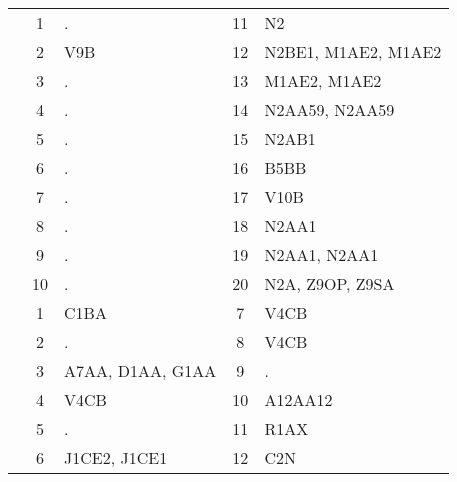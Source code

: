 \begin{table}[htbp]
\begin{tabular}{c c l c l}
	\addlinespace
	7 & 1 & . & 11 & N2 \\
	 & 2 & V9B & 12 & N2BE1, M1AE2, M1AE2 \\
	 & 3 & . & 13 & M1AE2, M1AE2 \\
	 & 4 & . & 14 & N2AA59, N2AA59 \\
	 & 5 & . & 15 & N2AB1 \\
	 & 6 & . & 16 & B5BB \\
	 & 7 & . & 17 & V10B \\
	 & 8 & . & 18 & N2AA1 \\
	 & 9 & . & 19 & N2AA1, N2AA1 \\
	 & 10 & . & 20 & N2A, Z9OP, Z9SA \\
	\addlinespace
	8 & 1 & C1BA & 7 & V4CB \\
	 & 2 & . & 8 & V4CB \\
	 & 3 & A7AA, D1AA, G1AA & 9 & . \\
	 & 4 & V4CB & 10 & A12AA12 \\
	 & 5 & . & 11 & R1AX \\
	 & 6 & J1CE2, J1CE1 & 12 & C2N \\
	\bottomrule
\end{tabular}
\end{table}

